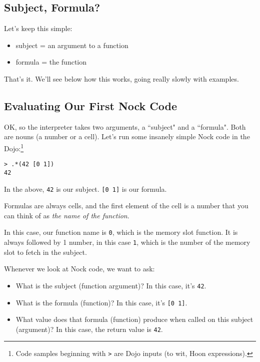 \documentclass[twoside]{article}
\begin{document}
\subsection{Subject, Formula?}

Let's keep this simple:

\begin{itemize}
  \item  subject = an argument to a function
  \item  formula = the function
\end{itemize}

That's it. We'll see below how this works, going really slowly with examples.

\subsection{Evaluating Our First Nock Code}

OK, so the interpreter takes two arguments, a ``subject" and a ``formula". Both are nouns (a number or a cell). Let's run some insanely simple Nock code in the Dojo:\footnote{Code samples beginning with \lstinline[style=inlinecode]{>} are Dojo inputs (to wit, Hoon expressions).}

\begin{lstlisting}[style=listingcode]
> .*(42 [0 1])
42
\end{lstlisting}

In the above, \lstinline[style=inlinecode]{42} is our subject. \lstinline[style=inlinecode]{[0 1]} is our formula.

Formulas are always cells, and the first element of the cell is a number that you can think of as \emph{the name of the function}.

In this case, our function name is \lstinline[style=inlinecode]{0}, which is the memory slot function. It is always followed by 1 number, in this case \lstinline[style=inlinecode]{1}, which is the number of the memory slot to fetch in the subject.

Whenever we look at Nock code, we want to ask:

\begin{itemize}
  \item  What is the subject (function argument)? In this case, it's \lstinline[style=inlinecode]{42}.
  \item  What is the formula (function)? In this case, it's \lstinline[style=inlinecode]{[0 1]}.
  \item  What value does that formula (function) produce when called on this subject (argument)? In this case, the return value is \lstinline[style=inlinecode]{42}.
\end{itemize}
\end{document}

